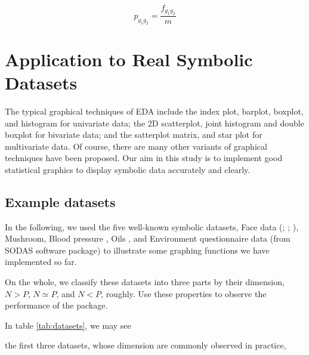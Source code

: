 \documentclass[article]{jss}
\begin{document}
\begin{equation}\label{eq:bi_rel_fg}
p_{g_1g_2} = \frac{f_{g_1g_2}}{m}
\end{equation}



\section{Application to Real Symbolic Datasets}

The typical graphical techniques of EDA include the index plot, barplot, boxplot, and histogram for univariate data; the 2D scatterplot, joint histogram and double boxplot for bivariate data; and the satterplot matrix, and star plot for multivariate data. Of course, there are many other variants of graphical techniques have been proposed. Our aim in this study is to implement good statistical graphics to display symbolic data accurately and clearly. 

\subsection{Example datasets}

In the following, we used the five well-known symbolic datasets, Face data (\cite{leroy:1996}; \cite{douzal:2011}; \cite{le:2012}), Mushroom, Blood pressure \cite{billard:2006}, Oils \cite{ichino:1994}, and Environment questionnaire data (from SODAS software package) to illustrate some graphing functions we have implemented so far. 

On the whole, we classify these datasets into three parts by their dimension, $N > P$, $N \simeq P$, and $N < P$, roughly.
Use these properties to observe the performance of the   package. 

In table \ref{tab:datasets}, we may see 


the first three datasets, whose dimension are commonly observed in practice, 
\end{document}
